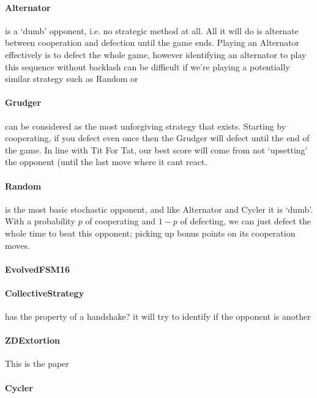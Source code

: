 \paragraph{Alternator} is a `dumb' opponent, i.e. no strategic method at all. All it will do is alternate between cooperation and defection until the game ends. Playing an Alternator effectively is to defect the whole game, however identifying an alternator to play this sequence without backlash can be difficult if we're playing a potentially similar strategy such as Random or 
\paragraph{Grudger} can be considered as the most unforgiving strategy that exists.
Starting by cooperating, if you defect even once then the Grudger will defect until the end of the game.
In line with Tit For Tat, our best score will come from not `upsetting' the opponent (until the last move where it cant react.
\paragraph{Random} is the most basic stochastic opponent, and like Alternator and Cycler it is `dumb'. 
With a probability $p$ of cooperating and $1-p$ of defecting, we can just defect the whole time to beat this opponent; picking up bonus points on its cooperation moves.
\paragraph{EvolvedFSM16}  
\paragraph{CollectiveStrategy} has the property of a handshake? it will try to identify if the opponent is another
\paragraph{ZDExtortion}
This is the paper~\cite{press2012iterated}
\paragraph{Cycler}

